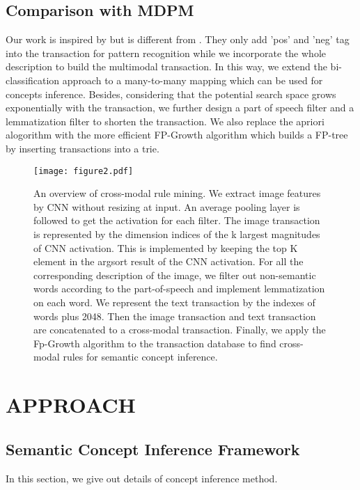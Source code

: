 \documentclass[sigconf]{acmart}
\begin{document}
\subsection{Comparison with MDPM}
Our work is inspired by \cite{li2015mid} but is different from \cite{li2015mid}. They only add 'pos' and 'neg' tag into the transaction for pattern recognition while we incorporate the whole description to build the multimodal transaction. In this way, we extend the bi-classification approach to a many-to-many mapping which can be used for concepts inference.  Besides, considering that the potential search space grows exponentially with the transaction, we further design a part of speech filter and a lemmatization filter to shorten the transaction. We also replace the apriori alogorithm with the more efficient FP-Growth algorithm which builds a FP-tree by inserting transactions into a trie.

\begin{figure*}[t] 
\centering 
\texttt{[image: figure2.pdf]} 
\caption{An overview of cross-modal rule mining. We extract image features by CNN without resizing at input. An average pooling layer is followed to get the activation for each filter. The image transaction is represented by the dimension indices of the k largest magnitudes of CNN activation. This is implemented by keeping the top K element in the argsort result of the CNN activation. For all the corresponding description of the image, we filter out non-semantic words according to the part-of-speech and implement lemmatization on each word. We represent the text transaction by the indexes of words plus 2048. Then the image transaction and text transaction are concatenated to a cross-modal transaction. Finally, we apply the Fp-Growth\cite{Han:2000:MFP:335191.335372} algorithm to the transaction database to find cross-modal rules for semantic concept inference. }
\label{figure2}
\end{figure*}

\section{APPROACH}
\subsection{Semantic Concept Inference Framework\label{section3.1}}
In this section, we give out details of concept inference method. 
\end{document}
